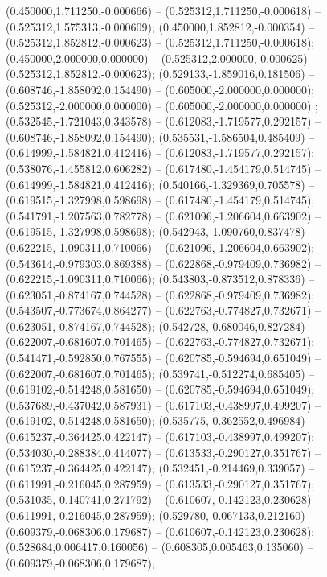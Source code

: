  (0.450000,1.711250,-0.000666) -- (0.525312,1.711250,-0.000618) -- (0.525312,1.575313,-0.000609);
 (0.450000,1.852812,-0.000354) -- (0.525312,1.852812,-0.000623) -- (0.525312,1.711250,-0.000618);
 (0.450000,2.000000,0.000000) -- (0.525312,2.000000,-0.000625) -- (0.525312,1.852812,-0.000623);
 (0.529133,-1.859016,0.181506) -- (0.608746,-1.858092,0.154490) -- (0.605000,-2.000000,0.000000);
 (0.525312,-2.000000,0.000000) -- (0.605000,-2.000000,0.000000) ;
 (0.532545,-1.721043,0.343578) -- (0.612083,-1.719577,0.292157) -- (0.608746,-1.858092,0.154490);
 (0.535531,-1.586504,0.485409) -- (0.614999,-1.584821,0.412416) -- (0.612083,-1.719577,0.292157);
 (0.538076,-1.455812,0.606282) -- (0.617480,-1.454179,0.514745) -- (0.614999,-1.584821,0.412416);
 (0.540166,-1.329369,0.705578) -- (0.619515,-1.327998,0.598698) -- (0.617480,-1.454179,0.514745);
 (0.541791,-1.207563,0.782778) -- (0.621096,-1.206604,0.663902) -- (0.619515,-1.327998,0.598698);
 (0.542943,-1.090760,0.837478) -- (0.622215,-1.090311,0.710066) -- (0.621096,-1.206604,0.663902);
 (0.543614,-0.979303,0.869388) -- (0.622868,-0.979409,0.736982) -- (0.622215,-1.090311,0.710066);
 (0.543803,-0.873512,0.878336) -- (0.623051,-0.874167,0.744528) -- (0.622868,-0.979409,0.736982);
 (0.543507,-0.773674,0.864277) -- (0.622763,-0.774827,0.732671) -- (0.623051,-0.874167,0.744528);
 (0.542728,-0.680046,0.827284) -- (0.622007,-0.681607,0.701465) -- (0.622763,-0.774827,0.732671);
 (0.541471,-0.592850,0.767555) -- (0.620785,-0.594694,0.651049) -- (0.622007,-0.681607,0.701465);
 (0.539741,-0.512274,0.685405) -- (0.619102,-0.514248,0.581650) -- (0.620785,-0.594694,0.651049);
 (0.537689,-0.437042,0.587931) -- (0.617103,-0.438997,0.499207) -- (0.619102,-0.514248,0.581650);
 (0.535775,-0.362552,0.496984) -- (0.615237,-0.364425,0.422147) -- (0.617103,-0.438997,0.499207);
 (0.534030,-0.288384,0.414077) -- (0.613533,-0.290127,0.351767) -- (0.615237,-0.364425,0.422147);
 (0.532451,-0.214469,0.339057) -- (0.611991,-0.216045,0.287959) -- (0.613533,-0.290127,0.351767);
 (0.531035,-0.140741,0.271792) -- (0.610607,-0.142123,0.230628) -- (0.611991,-0.216045,0.287959);
 (0.529780,-0.067133,0.212160) -- (0.609379,-0.068306,0.179687) -- (0.610607,-0.142123,0.230628);
 (0.528684,0.006417,0.160056) -- (0.608305,0.005463,0.135060) -- (0.609379,-0.068306,0.179687);

